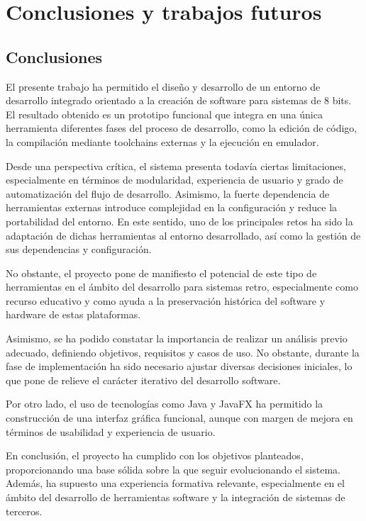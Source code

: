 \documentclass[../../main.tex]{subfiles}
\begin{document}
\chapter{Conclusiones y trabajos futuros}
\label{C:conclusiones}

\section{Conclusiones} 

El presente trabajo ha permitido el diseño y desarrollo de un entorno de desarrollo integrado orientado a la creación de software para sistemas de 8 bits. El resultado obtenido es un prototipo funcional que integra en una única herramienta diferentes fases del proceso de desarrollo, como la edición de código, la compilación mediante toolchains externas y la ejecución en emulador.

Desde una perspectiva crítica, el sistema presenta todavía ciertas limitaciones, especialmente en términos de modularidad, experiencia de usuario y grado de automatización del flujo de desarrollo. Asimismo, la fuerte dependencia de herramientas externas introduce complejidad en la configuración y reduce la portabilidad del entorno. En este sentido, uno de los principales retos ha sido la adaptación de dichas herramientas al entorno desarrollado, así como la gestión de sus dependencias y configuración.

No obstante, el proyecto pone de manifiesto el potencial de este tipo de herramientas en el ámbito del desarrollo para sistemas retro, especialmente como recurso educativo y como ayuda a la preservación histórica del software y hardware de estas plataformas.

Asimismo, se ha podido constatar la importancia de realizar un análisis previo adecuado, definiendo objetivos, requisitos y casos de uso. No obstante, durante la fase de implementación ha sido necesario ajustar diversas decisiones iniciales, lo que pone de relieve el carácter iterativo del desarrollo software.

Por otro lado, el uso de tecnologías como Java y JavaFX ha permitido la construcción de una interfaz gráfica funcional, aunque con margen de mejora en términos de usabilidad y experiencia de usuario.

En conclusión, el proyecto ha cumplido con los objetivos planteados, proporcionando una base sólida sobre la que seguir evolucionando el sistema. Además, ha supuesto una experiencia formativa relevante, especialmente en el ámbito del desarrollo de herramientas software y la integración de sistemas de terceros.
\end{document}
